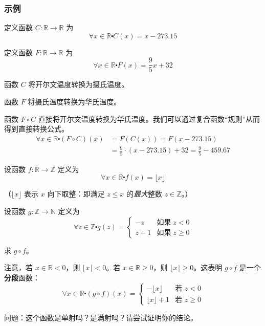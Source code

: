 \subsubsection*{示例}

\begin{example}
    定义函数 $ C : \mathbb{R} \to \mathbb{R}$ 为
    \[\forall x \in \mathbb{R} \centerdot C(x) = x - 273.15\]

    定义函数 $ F : \mathbb{R} \to \mathbb{R}$ 为
    \[\forall x \in \mathbb{R} \centerdot F(x) = \frac{9}{5}x + 32\]

    函数 $C$ 将开尔文温度转换为摄氏温度。

    函数 $F$ 将摄氏温度转换为华氏温度。

    函数 $F \circ C$ 直接将开尔文温度转换为华氏温度。我们可以通过复合函数``规则''从而得到直接转换公式。
    \begin{align*}
        \forall x \in \mathbb{R} \centerdot (F \circ C)(x) & = F(C(x)) = F(x - 273.15)                                  \\
                                                           & = \frac{9}{5} \cdot (x - 273.15) + 32 = \frac{9}{5}-459.67
    \end{align*}
\end{example}

\begin{example}
    设函数 $f : \mathbb{R} \to \mathbb{Z}$ 定义为
    \[\forall x \in \mathbb{R} \centerdot f(x) = \lfloor x \rfloor\]

    （$\lfloor x \rfloor$ 表示 $x$ 向下取整：即满足 $z \le x$ 的\emph{最大}整数 $z \in \mathbb{Z}$。）

    设函数 $g : \mathbb{Z} \to \mathbb{N}$ 定义为
    \[\forall z \in \mathbb{Z} \centerdot g(z) = \begin{cases}
            -z  & \text{如果}\;z<0     \\
            z+1 & \text{如果}\;z \ge 0
        \end{cases}\]

    求 $g \circ f$。

    注意，若 $x \in \mathbb{R} < 0$，则 $\lfloor x \rfloor < 0$。若 $x \in \mathbb{R} \ge 0$，则 $\lfloor x \rfloor \ge 0$。这表明 $g \circ f$ 是一个\textbf{分段}函数：
    \[\forall x \in \mathbb{R} \centerdot (g \circ f)(x) = \begin{cases}
            -\lfloor x \rfloor  & \text{若\ } z<0     \\
            \lfloor x \rfloor+1 & \text{若\ } z \ge 0
        \end{cases}\]

    问题：这个函数是单射吗？是满射吗？请尝试证明你的结论。
\end{example}

